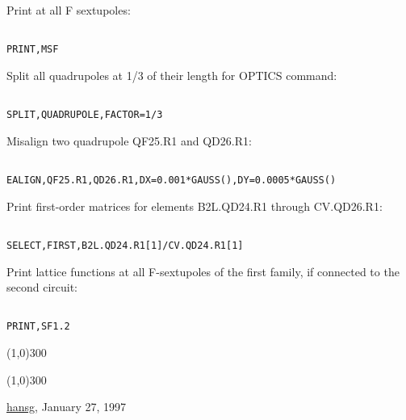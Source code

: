 Print at all F sextupoles: 
\begin{verbatim}

PRINT,MSF
\end{verbatim}

Split all quadrupoles at 1/3 of their length for OPTICS command: 
\begin{verbatim}

SPLIT,QUADRUPOLE,FACTOR=1/3
\end{verbatim}

Misalign two quadrupole QF25.R1 and QD26.R1: 
\begin{verbatim}

EALIGN,QF25.R1,QD26.R1,DX=0.001*GAUSS(),DY=0.0005*GAUSS()
\end{verbatim}

Print first-order matrices for elements B2L.QD24.R1 through CV.QD26.R1: 
\begin{verbatim}

SELECT,FIRST,B2L.QD24.R1[1]/CV.QD24.R1[1]
\end{verbatim}

Print lattice functions at all F-sextupoles of the first family, if connected to the second circuit: 
\begin{verbatim}

PRINT,SF1.2
\end{verbatim}

\line(1,0){300}

\line(1,0){300}

\href{http://www.cern.ch/Hans.Grote/hansg_sign.html}{hansg}, January 27, 1997 

